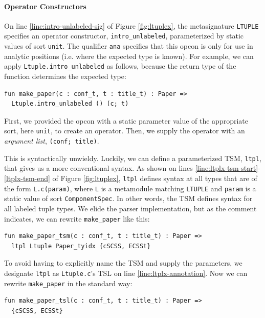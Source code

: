 \paragraph{Operator Constructors} On line \ref{line:intro-unlabeled-sig} of Figure \ref{fig:ltuplex}, the metasignature \lstinline{LTUPLE} specifies an operator constructor, \lstinline{intro_unlabeled}, parameterized by static values of sort \lstinline{unit}. The qualifier \lstinline{ana} specifies that this opcon is only for use in analytic positions (i.e. where the expected type is known). For example, we can apply \lstinline{Ltuple.intro_unlabeled} as follows, because the return type of the function determines the expected type:
\begin{lstlisting}[numbers=none]
fun make_paper(c : conf_t, t : title_t) : Paper => 
  Ltuple.intro_unlabeled () (c; t)
\end{lstlisting}
First, we provided the opcon with a static parameter value of the appropriate sort, here \lstinline{unit}, to create an operator. Then, we supply the operator with an \emph{argument list}, \lstinline{(conf; title)}.

This is syntactically unwieldy. Luckily, we can define a parameterized TSM, \lstinline{ltpl}, that gives us a more conventional syntax. As shown on lines \ref{line:ltplx-tsm-start}-\ref{ltplx-tsm-end} of Figure \ref{fig:ltuplex}, \lstinline{ltpl} defines syntax at all types that are of the form \lstinline{L.c(param)}, where \lstinline{L} is a metamodule matching \lstinline{LTUPLE} and \lstinline{param} is a static value of sort \lstinline{ComponentSpec}. In other words, the TSM defines syntax for all labeled tuple types. We elide the parser implementation, but as the comment indicates, we can rewrite \lstinline{make_paper} like this:
\begin{lstlisting}[numbers=none]
fun make_paper_tsm(c : conf_t, t : title_t) : Paper => 
  ltpl Ltuple Paper_tyidx {cSCSS, ECSSt}
\end{lstlisting}

To avoid having to explicitly name the TSM and supply the parameters, we designate \lstinline{ltpl} as \lstinline{Ltuple.c}'s TSL on line \ref{line:ltplx-annotation}. Now we can rewrite \lstinline{make_paper} in the standard way:
\begin{lstlisting}[numbers=none]
fun make_paper_tsl(c : conf_t, t : title_t) : Paper => 
  {cSCSS, ECSSt}
\end{lstlisting}

